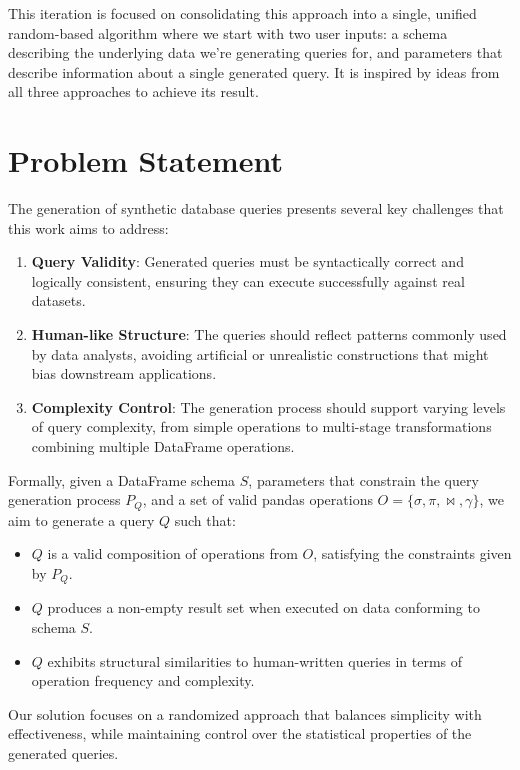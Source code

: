 \documentclass[10pt, twocolumn]{article}
\begin{document}
\noindent
This iteration is focused on consolidating this approach into a single, unified random-based algorithm where we start with two user inputs: a schema describing the underlying data we're generating queries for, and parameters that describe information about a single generated query. It is inspired by ideas from all three approaches to achieve its result.

\section{Problem Statement}
The generation of synthetic database queries presents several
key challenges that this work aims to address:

\begin{enumerate}
  \item \textbf{Query Validity}: Generated queries must be
    syntactically correct and logically consistent, ensuring
    they can execute successfully against real datasets.

  \item \textbf{Human-like Structure}: The queries should
    reflect patterns commonly used by data analysts, avoiding
    artificial or unrealistic constructions that might bias
    downstream applications.

  \item \textbf{Complexity Control}: The generation process
    should support varying levels of query complexity, from
    simple operations to multi-stage transformations combining
    multiple DataFrame operations.
\end{enumerate}

\noindent
Formally, given a DataFrame schema $S$, parameters that constrain the query generation process $P_{Q}$, and a set of valid
pandas operations $O = \{\sigma, \pi, \bowtie, \gamma\}$, we
aim to generate a query $Q$ such that:

\begin{itemize}
  \item $Q$ is a valid composition of operations from $O$, satisfying the constraints given by $P_{Q}$.
  \item $Q$ produces a non-empty result set when executed on data conforming to schema $S$.
  \item $Q$ exhibits structural similarities to human-written queries in terms of operation frequency and complexity.
\end{itemize}

\noindent
Our solution focuses on a randomized approach that balances
simplicity with effectiveness, while maintaining control over
the statistical properties of the generated queries.
\end{document}

